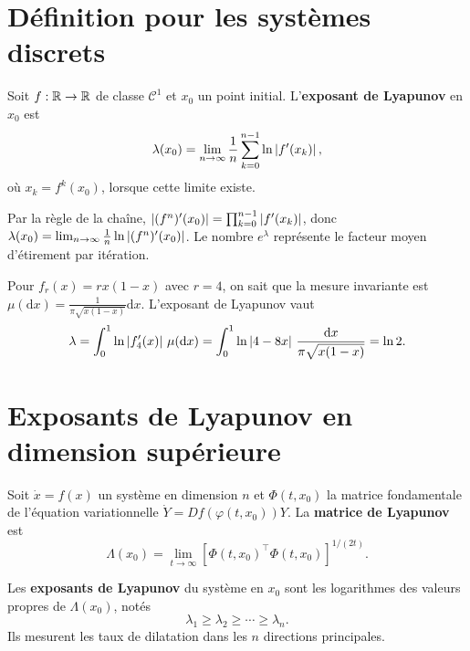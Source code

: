 \section{D\'efinition pour les syst\`emes discrets}

\begin{definition}
\label{def:lyap-1d}
Soit $f : \mathbb{R} \to \mathbb{R}$ de classe $\mathcal{C}^1$ et $x_0$ un point initial.
L'\textbf{exposant de Lyapunov}
en $x_0$ est
\[
    \lambda(x_0) = \lim_{n \to \infty} \frac{1}{n} \sum_{k=0}^{n-1}
    \ln \left| f'(x_k) \right|,
\]
o\`u $x_k = f^k(x_0)$, lorsque cette limite existe.
\end{definition}

\begin{remarque}
Par la r\`egle de la cha\^ine, $\left| (f^n)'(x_0) \right| = \prod_{k=0}^{n-1} \left| f'(x_k) \right|$,
donc $\lambda(x_0) = \lim_{n \to \infty} \frac{1}{n} \ln \left| (f^n)'(x_0) \right|$.
Le nombre $e^\lambda$ repr\'esente le facteur moyen d'\'etirement par it\'eration.
\end{remarque}

\begin{exemple}
Pour $f_r(x) = rx(1-x)$ avec $r = 4$, on sait que la mesure invariante est
$\mu(\mathrm{d}x) = \frac{1}{\pi\sqrt{x(1-x)}}\mathrm{d}x$. L'exposant de
Lyapunov vaut
\[
    \lambda = \int_0^1 \ln\left| f_4'(x) \right|\,\mu(\mathrm{d}x)
    = \int_0^1 \ln\left| 4 - 8x \right|\,\frac{\mathrm{d}x}{\pi\sqrt{x(1-x)}} = \ln 2.
\]
\end{exemple}

\section{Exposants de Lyapunov en dimension sup\'erieure}

\begin{definition}
Soit $\dot{x} = f(x)$ un syst\`eme en dimension $n$ et $\Phi(t, x_0)$ la
matrice fondamentale de l'\'equation variationnelle $\dot{Y} = Df(\varphi(t, x_0))Y$.
La \textbf{matrice de Lyapunov} est
\[
    \Lambda(x_0) = \lim_{t \to \infty} \left[\Phi(t, x_0)^\top \Phi(t, x_0)\right]^{1/(2t)}.
\]
\end{definition}

\begin{definition}
Les \textbf{exposants de Lyapunov} du
syst\`eme en $x_0$ sont les logarithmes des valeurs propres de $\Lambda(x_0)$,
not\'es
\[
    \lambda_1 \geq \lambda_2 \geq \cdots \geq \lambda_n.
\]
Ils mesurent les taux de dilatation dans les $n$ directions principales.
\end{definition}

